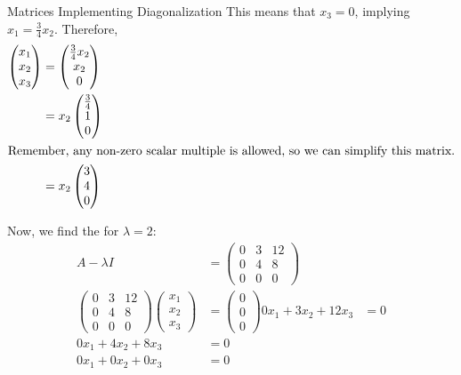 \begin{example}{Matrices Implementing Diagonalization}
  This means that $x_{3} = 0$, implying $x_{1} = \frac{3}{4} x_{2}$.
  Therefore,
  \begin{align*}
    \begin{pmatrix}
      x_{1} \\ x_{2} \\ x_{3}
    \end{pmatrix} &=
                    \begin{pmatrix}
                      \frac{3}{4} x_{2} \\ x_{2} \\ 0
                    \end{pmatrix} \\
    &= x_{2}
      \begin{pmatrix}
        \frac{3}{4} \\ 1 \\ 0
      \end{pmatrix} \\
    \intertext{Remember, any non-zero scalar multiple is allowed, so we can simplify this matrix.}
    &= x_{2}
      \begin{pmatrix}
        3 \\ 4 \\ 0
      \end{pmatrix}
  \end{align*}

  Now, we find the  for $\lambda = 2$:
  \begin{align*}
    A - \lambda I &=
                    \begin{pmatrix}
                      0 & 3 & 12 \\
                      0 & 4 & 8 \\
                      0 & 0 & 0
                    \end{pmatrix} \\
    \begin{pmatrix}
      0 & 3 & 12 \\
      0 & 4 & 8 \\
      0 & 0 & 0
    \end{pmatrix}
              \begin{pmatrix}
                x_{1} \\ x_{2} \\ x_{3}
              \end{pmatrix} &=
                              \begin{pmatrix}
                                0 \\ 0 \\ 0
                              \end{pmatrix}
    0x_{1} + 3x_{2} + 12x_{3} &= 0 \\
    0x_{1} + 4x_{2} + 8x_{3} &= 0 \\
    0x_{1} + 0x_{2} + 0x_{3} &= 0 \\
  \end{align*}


\end{example}
